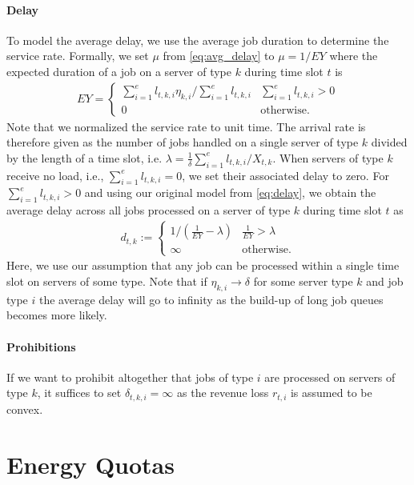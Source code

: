 \paragraph{Delay} To model the average delay, we use the average job duration to determine the service rate. Formally, we set $\mu$ from \cref{eq:avg_delay} to $\mu = 1 / E Y$ where the expected duration of a job on a server of type $k$ during time slot $t$ is \begin{align*}
    E Y = \begin{cases}
        \sum_{i=1}^e l_{t,k,i} \eta_{k,i} / \sum_{i=1}^e l_{t,k,i} & \sum_{i=1}^e l_{t,k,i} > 0 \\
        0 & \text{otherwise}.
    \end{cases}
\end{align*} Note that we normalized the service rate to unit time. The arrival rate is therefore given as the number of jobs handled on a single server of type $k$ divided by the length of a time slot, i.e. $\lambda = \frac{1}{\delta} \sum_{i=1}^e l_{t,k,i} / X_{t,k}$. When servers of type $k$ receive no load, i.e., $\sum_{i=1}^e l_{t,k,i} = 0$, we set their associated delay to zero. For $\sum_{i=1}^e l_{t,k,i} > 0$ and using our original model from \cref{eq:delay}, we obtain the average delay across all jobs processed on a server of type $k$ during time slot $t$ as \begin{align*}
    d_{t,k} := \begin{cases}
        1 / \left(\frac{1}{E Y} - \lambda\right) & \frac{1}{E Y} > \lambda \\
        \infty & \text{otherwise}.
    \end{cases}
\end{align*} Here, we use our assumption that any job can be processed within a single time slot on servers of some type. Note that if $\eta_{k,i} \to \delta$ for some server type $k$ and job type $i$ the average delay will go to infinity as the build-up of long job queues becomes more likely.

\paragraph{Prohibitions} If we want to prohibit altogether that jobs of type $i$ are processed on servers of type $k$, it suffices to set $\delta_{t,k,i} = \infty$ as the revenue loss $r_{t,i}$ is assumed to be convex.

\section{Energy Quotas}\label{section:application:energy_quotas}

